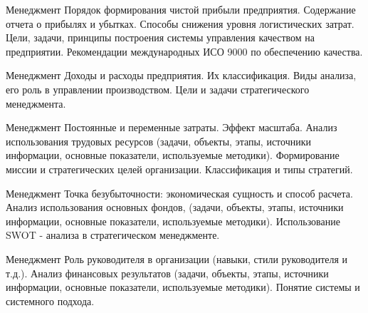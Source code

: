 \documentclass[
	11pt,
	a4paper,
	]
	{article}
\begin{document}
\vfill



\begin{minipage}[t][\miniH]{\miniL}\centering
	 {Менеджмент}
		{
			Порядок формирования чистой прибыли предприятия. Содержание отчета о прибылях и убытках.
		}{
			Способы снижения уровня логистических затрат.
		}{
			Цели, задачи, принципы построения системы управления качеством на предприятии. Рекомендации международных ИСО 9000 по обеспечению качества.
		}
	\lowGE
\end{minipage}





\begin{minipage}[t][\miniH]{\miniL}\centering
	 {Менеджмент}
		{
			Доходы и расходы предприятия. Их классификация.
		}{
			Виды анализа, его роль в управлении производством.
		}{
			Цели и задачи стратегического менеджмента.
		}
	\lowGE
\end{minipage}

\vfill



\begin{minipage}[t][\miniH]{\miniL}\centering
	 {Менеджмент}
		{
			Постоянные и переменные затраты. Эффект масштаба.
		}{
			Анализ использования трудовых ресурсов (задачи, объекты, этапы, источники информации, основные показатели, используемые методики).
		}{
			Формирование миссии и стратегических целей организации. Классификация и типы стратегий.
		}
	\lowGE
\end{minipage}

\vfill



\begin{minipage}[t][\miniH]{\miniL}\centering
	 {Менеджмент}
		{
			Точка безубыточности: экономическая сущность и способ расчета.
		}{
			Анализ использования основных фондов, (задачи, объекты, этапы, источники информации, основные показатели, используемые методики).
		}{
			Использование SWOT - анализа в стратегическом менеджменте.
		}
	\lowGE
\end{minipage}





\begin{minipage}[t][\miniH]{\miniL}\centering
	 {Менеджмент}
		{
			Роль руководителя в организации (навыки, стили руководителя и т.д.).
		}{
			Анализ финансовых результатов (задачи, объекты, этапы, источники информации, основные показатели, используемые методики).
		}{
			Понятие системы и системного подхода.
		}
	\lowGE
\end{minipage}
\end{document}
